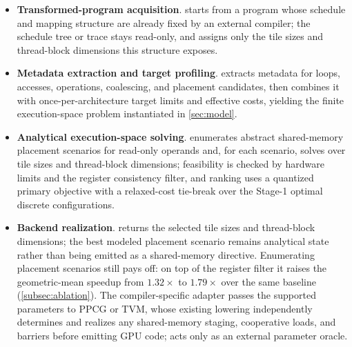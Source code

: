 \begingroup
\setlength{\topsep}{2pt plus 1pt minus 1pt}
\setlength{\partopsep}{0pt}
\setlength{\itemsep}{1pt plus 0.5pt minus 0.5pt}
\setlength{\parsep}{0pt}
\begin{itemize}[
  leftmargin=1.4em,
  labelsep=0.45em,
  topsep=2pt plus 1pt minus 1pt,
  partopsep=0pt,
  itemsep=1pt plus 0.5pt minus 0.5pt,
  parsep=0pt
]
  \item \textbf{Transformed-program acquisition}. \name starts from a program whose schedule and mapping structure are already fixed by an external compiler; the schedule tree or trace stays read-only, and \name assigns only the tile sizes and thread-block dimensions this structure exposes.
  \item \textbf{Metadata extraction and target profiling}. \name extracts metadata for loops, accesses, operations, coalescing, and placement candidates, then combines it with once-per-architecture target limits and effective costs, yielding the finite execution-space problem instantiated in \autoref{sec:model}.
  \item \textbf{Analytical execution-space solving}. \name enumerates abstract shared-memory placement scenarios for read-only operands and, for each scenario, solves over tile sizes and thread-block dimensions; feasibility is checked by hardware limits and the register consistency filter, and ranking uses a quantized primary objective with a relaxed-cost tie-break over the Stage-1 optimal discrete configurations.
  \item \textbf{Backend realization}. \name returns the selected tile sizes and thread-block dimensions; the best modeled placement scenario remains analytical state rather than being emitted as a shared-memory directive. Enumerating placement scenarios still pays off: on top of the register filter it raises the geometric-mean speedup from \(1.32\times\) to \(1.79\times\) over the same baseline (\autoref{subsec:ablation}). The compiler-specific adapter passes the supported parameters to PPCG or TVM, whose existing lowering independently determines and realizes any shared-memory staging, cooperative loads, and barriers before emitting GPU code; \name acts only as an external parameter oracle.
\end{itemize}
\endgroup

